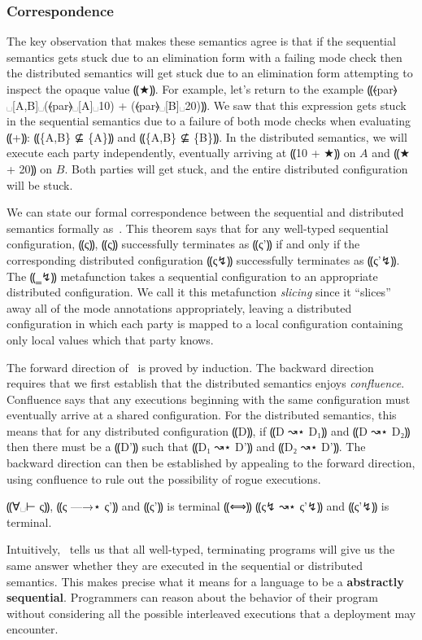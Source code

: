 \subsubsection{Correspondence}

The key observation that makes these semantics agree is that if the sequential semantics
gets stuck due to an elimination form with a failing mode check then the distributed semantics
will get stuck due to an elimination form attempting to inspect the opaque value ⸨★⸩. For example,
let's return to the example ⸨⦑par⦒␣[A,B]␣(⦑par⦒␣[A]␣10) + (⦑par⦒␣[B]␣20)⸩. We saw that this expression
gets stuck in the sequential semantics due to a failure of both mode checks when evaluating ⸨+⸩:
⸨\{A,B\} ⊈ \{A\}⸩ and ⸨\{A,B\} ⊈ \{B\}⸩. In the distributed semantics, we will execute each party
independently, eventually arriving at ⸨10 + ★⸩ on $A$ and ⸨★ + 20⸩ on $B$. Both parties will get
stuck, and the entire distributed configuration will be stuck.

We can state our formal correspondence between the sequential and distributed semantics formally
as~. This theorem says that for any well-typed sequential configuration,
⸨ς⸩, ⸨ς⸩ successfully terminates as ⸨ς'⸩ if and only if the corresponding distributed configuration
⸨ς↯⸩ successfully terminates as ⸨ς'↯⸩. The ⸨‗↯⸩ metafunction takes a sequential configuration to an
appropriate distributed configuration. We call it this metafunction \emph{slicing} since it ``slices''
away all of the mode annotations appropriately, leaving a distributed configuration in which each
party is mapped to a local configuration containing only local values which that party knows.

The forward direction of~ is proved by induction. The backward direction
requires that we first establish that the distributed semantics enjoys \emph{confluence}. Confluence
says that any executions beginning with the same configuration must eventually arrive at a shared
configuration. For the distributed semantics, this means that for any distributed configuration ⸨D⸩,
if ⸨D ↝⋆ D₁⸩ and ⸨D ↝⋆ D₂⸩ then there must be a ⸨D'⸩ such that ⸨D₁ ↝⋆ D'⸩ and ⸨D₂ ↝⋆ D'⸩. The backward
direction can then be established by appealing to the forward direction, using confluence to rule out the
possibility of rogue executions.

\begin{theorem}[Simulation] \label{thm:mpc-simulation}
  ⸨∀␣⊢ ς⸩, ⸨ς —→⋆ ς'⸩ and ⸨ς'⸩ is terminal ⸨⟺⸩ ⸨ς↯ ↝⋆ ς'↯⸩ and ⸨ς'↯⸩ is terminal.
\end{theorem}

Intuitively,~ tells us that all well-typed, terminating programs
will give us the same answer whether they are executed in the sequential or distributed semantics.
This makes precise what it means for a language to be a \textbf{abstractly sequential}. Programmers
can reason about the behavior of their program without considering all the possible interleaved
executions that a deployment may encounter.
